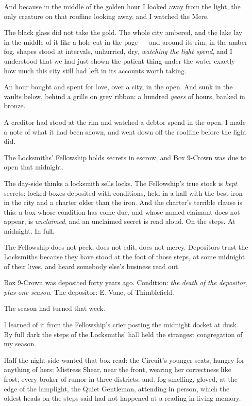 And because in the middle of the golden hour I looked away from the light, the only creature on that roofline looking away, and I watched the Mere.

The black glass did not take the gold. The whole city ambered, and the lake lay in the middle of it like a hole cut in the page --- and around its rim, in the amber fog, shapes stood at intervals, unhurried, dry, \emph{watching the light spend}, and I understood that we had just shown the patient thing under the water exactly how much this city still had left in its accounts worth taking.

An hour bought and spent for love, over a city, in the open. And sunk in the vaults below, behind a grille on grey ribbon: a hundred \emph{years} of hours, banked in bronze.

A creditor had stood at the rim and watched a debtor spend in the open. I made a note of what it had been shown, and went down off the roofline before the light did.

\scenebreak

The Locksmiths' Fellowship holds secrets in escrow, and Box 9-Crown was due to open that midnight.

The day-side thinks a locksmith sells locks. The Fellowship's true stock is \emph{kept} secrets: locked boxes deposited with conditions, held in a hall with the best iron in the city and a charter older than the iron. And the charter's terrible clause is this: a box whose condition has come due, and whose named claimant does not appear, is \emph{unclaimed}, and an unclaimed secret is read aloud. On the steps. At midnight. In full.

The Fellowship does not peek, does not edit, does not mercy. Depositors trust the Locksmiths because they have stood at the foot of those steps, at some midnight of their lives, and heard somebody else's business read out.

Box 9-Crown was deposited forty years ago. Condition: \emph{the death of the depositor, plus one season}. The depositor: E. Vane, of Thimblefield.

The season had turned that week.

I learned of it from the Fellowship's crier posting the midnight docket at dusk. By full dark the steps of the Locksmiths' hall held the strangest congregation of my season.

Half the night-side wanted that box read: the Circuit's younger seats, hungry for anything of hers; Mistress Shear, near the front, wearing her correctness like frost; every broker of rumor in three districts; and, fog-smelling, gloved, at the edge of the lamplight, the Quiet Gentleman, attending in person, which the oldest heads on the steps said had not happened at a reading in living memory.


